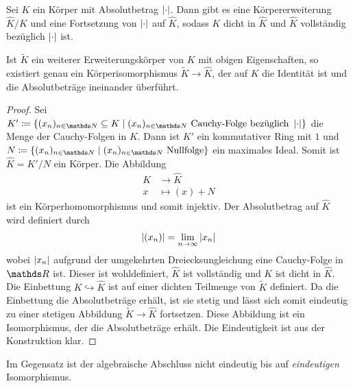 \begin{satz}
Sei $K$ ein Körper mit Absolutbetrag $\left\vert\cdot\right\vert$.
Dann gibt es eine Körpererweiterung $\hat{K}/K$ und eine Fortsetzung von $\left\vert\cdot\right\vert$ auf $\hat{K}$, sodass $K$ dicht in $\hat{K}$ und $\hat{K}$ vollständig bezüglich $\left\vert\cdot\right\vert$ ist.

Ist $\tilde{K}$ ein weiterer Erweiterungskörper von $K$ mit obigen Eigenschaften,
so existiert genau ein Körperisomorphismus $\tilde{K}\to \hat{K}$, der auf $K$ die Identität ist
und die Absolutbeträge ineinander überführt.
\begin{proof}
Sei $K'\coloneqq\{(x_n)_{n\in \N}\subseteq K \mid (x_n)_{n\in \N} \text{ Cauchy-Folge bezüglich } \abs{\cdot}\}$ die Menge der Cauchy-Folgen in $K$.
Dann ist $K'$ ein kommutativer Ring mit $1$ und $N\coloneqq\{(x_n)_{n\in \N}\mid (x_n)_{n\in \N} \text{ Nullfolge}\}$
ein maximales Ideal.
Somit ist $\hat{K}=K'/N$ ein Körper. Die Abbildung
\begin{align*}
K &\to \hat{K}\\
x &\mapsto (x)+N
\end{align*}
ist ein Körperhomomorphismus und somit injektiv.
Der Absolutbetrag auf $\hat{K}$ wird definiert durch
\begin{align*}
\left\vert(x_n)\right\vert=\lim_{n\to \infty} \left\vert x_n\right\vert
\end{align*}
wobei $\left\vert x_n\right\vert$ aufgrund der umgekehrten Dreiecksungleichung eine Cauchy-Folge in $\R$ ist.
Dieser ist wohldefiniert, $\hat{K}$ ist vollständig und $K$ ist dicht in $\hat{K}$.
Die Einbettung $K \hookrightarrow \hat{K}$ ist auf einer dichten Teilmenge von $\tilde{K}$ definiert.
Da die Einbettung die Absolutbeträge erhält, ist sie stetig und lässt sich somit eindeutig zu einer stetigen Abbildung $\tilde{K}\to \hat{K}$ fortsetzen.
Diese Abbildung ist ein Isomorphismus, der die Absolutbeträge erhält.
Die Eindeutigkeit ist aus der Konstruktion klar.
\end{proof}
\end{satz}

\begin{bem}
Im Gegensatz ist der algebraische Abschluss nicht eindeutig bis auf \emph{eindeutigen} Isomorphismus.
\end{bem}